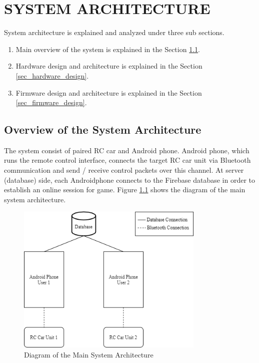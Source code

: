 \chapter{SYSTEM ARCHITECTURE} \label{chap_sys_architecture}
System architecture is explained and analyzed under three sub sections.
\begin{enumerate}
    \item Main overview of the system is explained in the Section \ref{sec_overview_sys_architecture}.
    \item Hardware design and architecture is explained in the Section \ref{sec_hardware_design}.
    \item Firmware design and architecture is explained in the Section \ref{sec_firmware_design}.
\end{enumerate}

\section{Overview of the System Architecture} \label{sec_overview_sys_architecture}

The system consist of paired RC car and Android phone. Android phone, which runs the remote control interface, connects the target RC car unit via Bluetooth communication and send / receive control packets over this channel. At server (database) side, each Android\texttrademark\;phone connects to the Firebase database in order to establish an online session for game. Figure \ref{fig:overview_architecture} shows the diagram of the main system architecture.

\begin{figure}[!htbp]
    \centering
    \includegraphics[width=0.8\textwidth]{Imgs/overview_of_sys.drawio.png}
    \caption{\label{fig:overview_architecture}Diagram of the Main System Architecture}
\end{figure}

